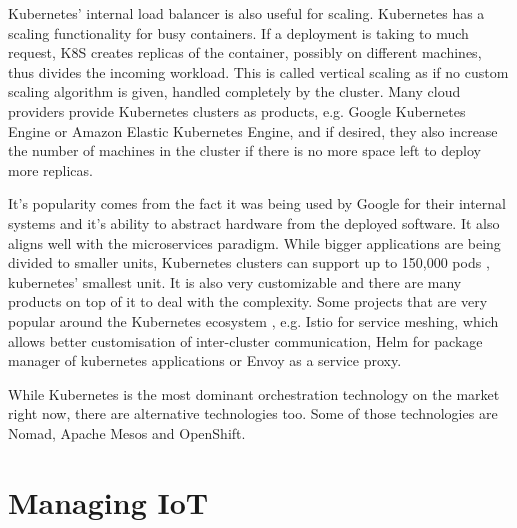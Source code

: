 Kubernetes' internal load balancer is also useful for scaling. Kubernetes has a scaling functionality for busy containers. If a deployment is taking to much request, K8S creates replicas of the container, possibly on different machines, thus divides the incoming workload. This is called vertical scaling as if no custom scaling algorithm is given, handled completely by the cluster. Many cloud providers provide Kubernetes clusters as products, e.g. Google Kubernetes Engine or Amazon Elastic Kubernetes Engine, and if desired, they also increase the number of machines in the cluster if there is no more space left to deploy more replicas.

It's popularity comes from the fact it was being used by Google for their internal systems and it's ability to abstract hardware from the deployed software. It also aligns well with the microservices paradigm. While bigger applications are being divided to smaller units, Kubernetes clusters can support up to 150,000 pods \cite{kubernetes-load}, kubernetes' smallest unit. It is also very customizable and there are many products on top of it to deal with the complexity. Some projects that are very popular around the Kubernetes ecosystem , e.g. Istio \cite{istio} for service meshing, which allows better customisation of inter-cluster communication, Helm \cite{helm} for package manager of kubernetes applications or Envoy \cite{envoy} as a service proxy.

While Kubernetes is the most dominant orchestration technology on the market right now, there are alternative technologies too. Some of those technologies are Nomad, Apache Mesos and OpenShift.

\newpage
\section{Managing IoT}
